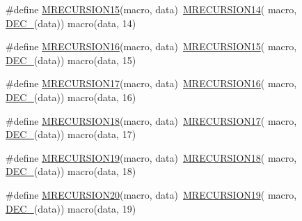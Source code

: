 \begin{DoxyCompactItemize}
\item 
\#define \mbox{\hyperlink{group__group__sam0__utils__mrecursion_ga5c619eed1b00d3df2ce0cc6335cfc3ad}{M\+R\+E\+C\+U\+R\+S\+I\+O\+N15}}(macro,  data)~\mbox{\hyperlink{group__group__sam0__utils__mrecursion_ga5ae353c3b90a3403ded4a710d1c7a897}{M\+R\+E\+C\+U\+R\+S\+I\+O\+N14}}(  macro, \mbox{\hyperlink{group__group__sam0__utils__mrecursion_ga1d23d683797679dca8c3512a54a5dcae}{D\+E\+C\+\_\+}}(data))   macro(data, 14)
\item 
\#define \mbox{\hyperlink{group__group__sam0__utils__mrecursion_ga0a04774b719e39b0dc77ef3fd9013110}{M\+R\+E\+C\+U\+R\+S\+I\+O\+N16}}(macro,  data)~\mbox{\hyperlink{group__group__sam0__utils__mrecursion_ga5c619eed1b00d3df2ce0cc6335cfc3ad}{M\+R\+E\+C\+U\+R\+S\+I\+O\+N15}}(  macro, \mbox{\hyperlink{group__group__sam0__utils__mrecursion_ga1d23d683797679dca8c3512a54a5dcae}{D\+E\+C\+\_\+}}(data))   macro(data, 15)
\item 
\#define \mbox{\hyperlink{group__group__sam0__utils__mrecursion_gad2d391ce496952ee9fda6f54753643f9}{M\+R\+E\+C\+U\+R\+S\+I\+O\+N17}}(macro,  data)~\mbox{\hyperlink{group__group__sam0__utils__mrecursion_ga0a04774b719e39b0dc77ef3fd9013110}{M\+R\+E\+C\+U\+R\+S\+I\+O\+N16}}(  macro, \mbox{\hyperlink{group__group__sam0__utils__mrecursion_ga1d23d683797679dca8c3512a54a5dcae}{D\+E\+C\+\_\+}}(data))   macro(data, 16)
\item 
\#define \mbox{\hyperlink{group__group__sam0__utils__mrecursion_ga4aa4bb7bd93ea144f77973e50a8a2d2d}{M\+R\+E\+C\+U\+R\+S\+I\+O\+N18}}(macro,  data)~\mbox{\hyperlink{group__group__sam0__utils__mrecursion_gad2d391ce496952ee9fda6f54753643f9}{M\+R\+E\+C\+U\+R\+S\+I\+O\+N17}}(  macro, \mbox{\hyperlink{group__group__sam0__utils__mrecursion_ga1d23d683797679dca8c3512a54a5dcae}{D\+E\+C\+\_\+}}(data))   macro(data, 17)
\item 
\#define \mbox{\hyperlink{group__group__sam0__utils__mrecursion_ga27660e09d1b9282813ab1df951daf01e}{M\+R\+E\+C\+U\+R\+S\+I\+O\+N19}}(macro,  data)~\mbox{\hyperlink{group__group__sam0__utils__mrecursion_ga4aa4bb7bd93ea144f77973e50a8a2d2d}{M\+R\+E\+C\+U\+R\+S\+I\+O\+N18}}(  macro, \mbox{\hyperlink{group__group__sam0__utils__mrecursion_ga1d23d683797679dca8c3512a54a5dcae}{D\+E\+C\+\_\+}}(data))   macro(data, 18)
\item 
\#define \mbox{\hyperlink{group__group__sam0__utils__mrecursion_ga478355d5095a62f243dae4c9de56094c}{M\+R\+E\+C\+U\+R\+S\+I\+O\+N20}}(macro,  data)~\mbox{\hyperlink{group__group__sam0__utils__mrecursion_ga27660e09d1b9282813ab1df951daf01e}{M\+R\+E\+C\+U\+R\+S\+I\+O\+N19}}(  macro, \mbox{\hyperlink{group__group__sam0__utils__mrecursion_ga1d23d683797679dca8c3512a54a5dcae}{D\+E\+C\+\_\+}}(data))   macro(data, 19)

\end{DoxyCompactItemize}
